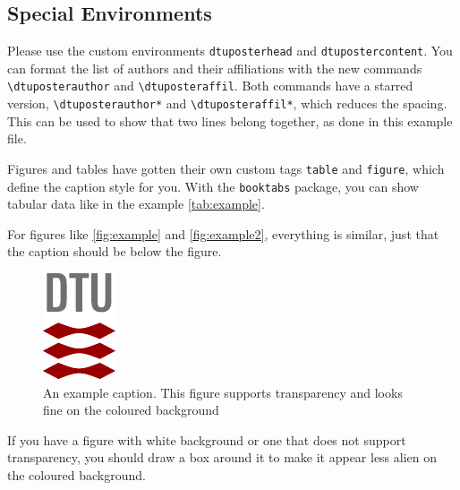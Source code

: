 \documentclass[
]{dtuposter}
\begin{document}
\begin{dtupostercontent}
\section{Special Environments}
Please use the custom environments \texttt{dtuposterhead} and 
\texttt{dtupostercontent}. You can format the list of authors and 
their affiliations with the new commands \texttt{\textbackslash dtuposterauthor}
and \texttt{\textbackslash dtuposteraffil}. Both commands have a starred version, 
\texttt{\textbackslash dtuposterauthor*} and \texttt{\textbackslash dtuposteraffil*}, 
which reduces the spacing. This can be used to show that two lines belong together, as
done in this example file.

Figures and tables have gotten their own custom tags \texttt{table} and 
\texttt{figure}, which define the caption style for you. With the \texttt{booktabs}
package, you can show tabular data like in the example \autoref{tab:example}.

For figures like \autoref{fig:example} and \autoref{fig:example2}, everything is 
similar, just that the caption should be below the figure. 

\begin{figure}
\includegraphics[width=.5\linewidth,angle=90,origin=c]{tex_dtu_logo}
\caption{An example caption. This figure supports transparency and looks fine on 
the coloured background}\label{fig:example}
\end{figure}

If you have a figure with white background or one that does not support transparency,
you should draw a box around it to make it appear less alien on the coloured background.


\end{dtupostercontent}
\end{document}
